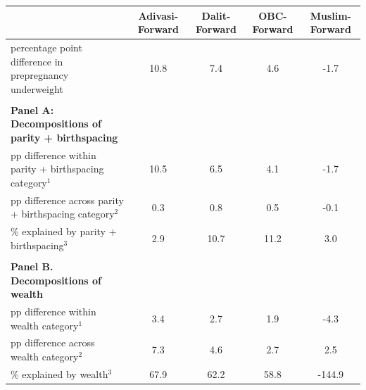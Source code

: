 \begin{tabular}{l*{4}{c}}
\toprule
            &\multicolumn{1}{c}{Adivasi-Forward}&\multicolumn{1}{c}{Dalit-Forward}&\multicolumn{1}{c}{OBC-Forward}&\multicolumn{1}{c}{Muslim-Forward}\\
\midrule
\midrule
percentage point difference in prepregnancy underweight&        10.8&         7.4&         4.6&        -1.7\\
            &            &            &            &            \\
\textbf{Panel A: Decompositions of parity + birthspacing}&            &            &            &            \\
pp difference within parity + birthspacing category$^{1}$&        10.5&         6.5&         4.1&        -1.7\\
pp difference across parity + birthspacing category$^{2}$&         0.3&         0.8&         0.5&        -0.1\\
\% explained by parity + birthspacing$^{3}$&         2.9&        10.7&        11.2&         3.0\\
            &            &            &            &            \\
\textbf{Panel B. Decompositions of wealth}&            &            &            &            \\
pp difference within wealth category$^{1}$&         3.4&         2.7&         1.9&        -4.3\\
pp difference across wealth category$^{2}$&         7.3&         4.6&         2.7&         2.5\\
\% explained by wealth$^{3}$&        67.9&        62.2&        58.8&      -144.9\\
\bottomrule
\end{tabular}
